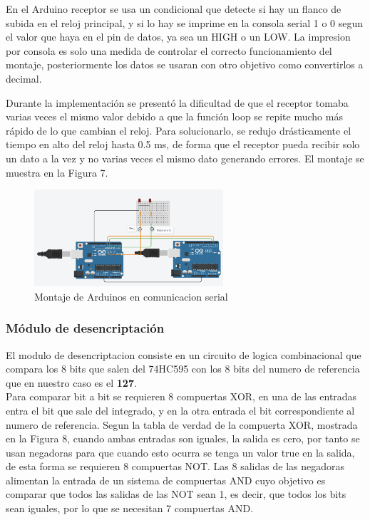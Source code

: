 \documentclass{article}
\begin{document}
En el Arduino receptor se usa un condicional que detecte si hay un flanco de subida en el reloj principal, y si lo hay se imprime en la consola serial 1 o 0 segun el valor que haya en el pin de datos, ya sea un HIGH o un LOW. La impresion por consola es solo una medida de controlar el correcto funcionamiento del montaje, posteriormente los datos se usaran con otro objetivo como convertirlos a decimal.

Durante la implementación se presentó la dificultad de que el receptor tomaba varias veces el mismo valor debido a que la función loop se repite mucho más rápido de lo que cambian el reloj. Para solucionarlo, se redujo drásticamente el tiempo en alto del reloj hasta 0.5 ms, de forma que el receptor pueda recibir solo un dato a la vez y no varias veces el mismo dato generando errores. El montaje se muestra en la Figura 7.

\begin{figure}[!ht] 
\includegraphics[width=7cm]{montajeSerial.PNG}
\centering
\caption{Montaje de Arduinos en comunicacion serial}
\end{figure}

\subsubsection{Módulo de desencriptación}
El modulo de desencriptacion consiste en un circuito de logica combinacional que compara los 8 bits que salen del 74HC595 con los 8 bits del numero de referencia que en nuestro caso es el \textbf{127}.\\

Para comparar bit a bit se requieren 8 compuertas XOR, en una de las entradas entra el bit que sale del integrado, y en la otra entrada el bit correspondiente al numero de referencia. Segun la tabla de verdad de la compuerta XOR, mostrada en la Figura 8, cuando ambas entradas son iguales, la salida es cero, por tanto se usan negadoras para que cuando esto ocurra se tenga un valor true en la salida, de esta forma se requieren 8 compuertas NOT. Las 8 salidas de las negadoras alimentan la entrada de un sistema de compuertas AND cuyo objetivo es comparar que todos las salidas de las NOT sean 1, es decir, que todos los bits sean iguales, por lo que se necesitan 7 compuertas AND.\\
\end{document}
